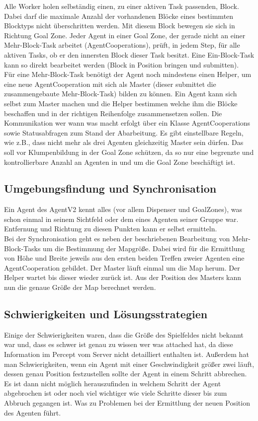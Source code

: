 \documentclass[runningheads]{llncs}
\begin{document}
Alle Worker holen selbständig einen, zu einer aktiven Task passenden, Block. Dabei darf die maximale Anzahl der vorhandenen Blöcke eines bestimmten Blocktyps nicht überschritten werden. Mit diesem Block bewegen sie sich in Richtung Goal Zone.
Jeder Agent in einer Goal Zone, der gerade nicht an einer Mehr-Block-Task arbeitet (AgentCooperations), prüft, in jedem Step, für alle aktiven Tasks, ob er den innersten Block dieser Task besitzt. Eine Ein-Block-Task kann so direkt bearbeitet werden (Block in Position bringen und submitten). \\

Für eine Mehr-Block-Task benötigt der Agent noch mindestens einen Helper, um eine neue AgentCooperation mit sich als Master (dieser submittet die zusammengebaute Mehr-Block-Task) bilden zu können. 
Ein Agent kann sich selbst zum Master machen und die Helper bestimmen welche ihm die Blöcke beschaffen und in der richtigen Reihenfolge zusammensetzen sollen.  
Die Kommunikation wer wann was macht erfolgt über ein Klasse AgentCooperations sowie Statusabfragen zum Stand der Abarbeitung. Es gibt einstellbare Regeln, wie z.B., dass nicht mehr als drei Agenten gleichzeitig Master sein dürfen. Das soll vor Klumpenbildung in der Goal Zone schützen, da so nur eine begrenzte und kontrollierbare Anzahl an Agenten in und um die Goal Zone beschäftigt ist.

\subsection{Umgebungsfindung und Synchronisation}
Ein Agent des AgentV2 kennt alles (vor allem Dispenser und GoalZones), was schon einmal in seinem Sichtfeld oder dem eines Agenten seiner Gruppe war. Entfernung und Richtung zu diesen Punkten kann er selbst ermitteln.\\

Bei der Synchronisation geht es neben der beschriebenen Bearbeitung von Mehr-Block-Tasks um die Bestimmung der Mapgröße. Dabei wird für die Ermittlung von Höhe und Breite jeweils aus den ersten beiden Treffen zweier Agenten eine AgentCooperation gebildet. Der Master läuft einmal um die Map herum. Der Helper wartet bis dieser wieder zurück ist. Aus der Position des Masters kann nun die genaue Größe der Map berechnet werden. 

\subsection{Schwierigkeiten und Lösungsstrategien}
Einige der Schwierigkeiten waren, dass die Größe des Spielfeldes nicht bekannt war und, dass es schwer ist genau zu wissen wer was attached hat, da diese Information im Percept vom Server nicht detailliert enthalten ist. Außerdem hat man Schwierigkeiten, wenn ein Agent mit einer Geschwindigkeit größer zwei läuft, dessen genau Position festzustellen sollte der Agent in einem Schritt abbrechen. Es ist dann nicht möglich herauszufinden in welchem Schritt der Agent abgebrochen ist oder noch viel wichtiger wie viele Schritte dieser bis zum Abbruch gegangen ist. Was zu Problemen bei der Ermittlung der neuen Position des Agenten führt.\\
\end{document}

